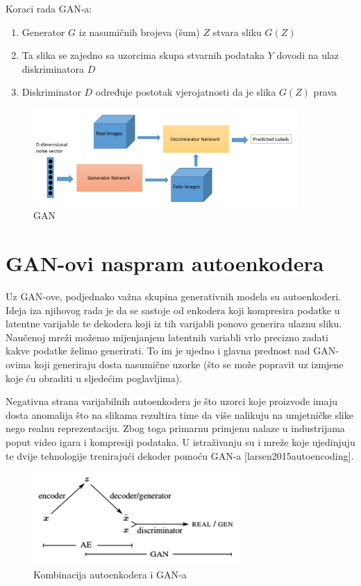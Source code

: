 \documentclass[lmodern, utf8, seminar]{fer}
\begin{document}
Koraci rada GAN-a:
\begin{enumerate} 
\item Generator $G$ iz nasumičnih brojeva (šum) $Z$ stvara sliku $G(Z)$
\item Ta slika se zajedno sa uzorcima skupa stvarnih podataka $Y$ dovodi na ulaz diskriminatora $D$
\item Diskriminator $D$ određuje postotak vjerojatnosti da je slika $G(Z)$ prava
\end{enumerate}

\begin{figure}[H]
    \centering
    \includegraphics[width=0.9\textwidth]{gan_schema}
    \caption{GAN \cite{goodfellow2016nips}}
    \label{fig:convolution}
\end{figure}

\section{GAN-ovi naspram autoenkodera}
Uz GAN-ove, podjednako važna skupina generativnih modela su autoenkoderi. Ideja iza njihovog rada je da se sastoje od enkodera koji kompresira podatke u latentne varijable te dekodera koji iz tih varijabli ponovo generira ulaznu sliku. Naučenoj mreži možemo mijenjanjem latentnih variabli vrlo precizno zadati kakve podatke želimo generirati. To im je ujedno i glavna prednost nad GAN-ovima koji generiraju dosta nasumične uzorke (što se može popravit uz izmjene koje ću obraditi u sljedećim poglavljima).

Negativna strana varijabilnih autoenkodera je što uzorci koje proizvode imaju dosta anomalija što na slikama rezultira time da više nalikuju na umjetničke slike nego realnu reprezentaciju. Zbog toga primarnu primjenu nalaze u industrijama poput video igara i kompresiji podataka. U istraživanju su i mreže koje ujedinjuju te dvije tehnologije trenirajući dekoder pomoću GAN-a [larsen2015autoencoding].

\begin{figure}[H]
    \centering
    \includegraphics[width=0.7\textwidth]{vae-gan}
    \caption{Kombinacija autoenkodera i GAN-a}
    \label{fig:vae-gan}
\end{figure}
\end{document}
